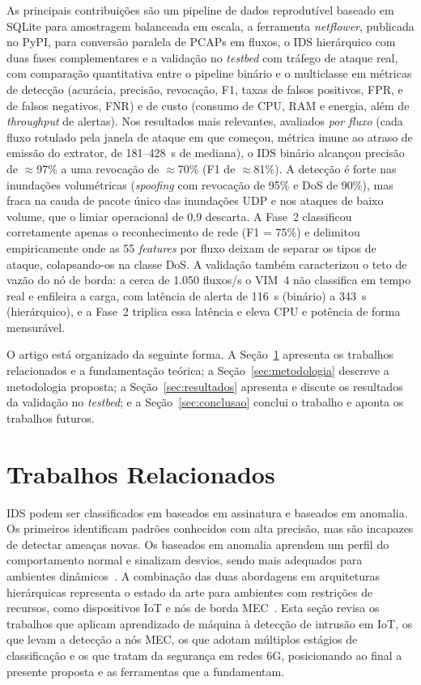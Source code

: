 \documentclass[12pt]{article}
\begin{document}
As principais contribuições são um pipeline de dados reprodutível baseado em
SQLite para amostragem balanceada em escala, a ferramenta \textit{netflower},
publicada no PyPI, para conversão paralela de PCAPs em fluxos, o IDS hierárquico
com duas fases complementares e a validação no \textit{testbed} com tráfego de
ataque real, com comparação quantitativa entre o pipeline binário e o
multiclasse em métricas de detecção (acurácia, precisão, revocação, F1, taxas de
falsos positivos, FPR, e de falsos negativos, FNR) e de custo (consumo de CPU, RAM e energia, além de \textit{throughput} de alertas). Nos resultados mais relevantes, avaliados \emph{por fluxo} (cada fluxo rotulado pela janela de ataque em que começou, métrica imune ao atraso de emissão do extrator, de 181--428~s de mediana), o IDS binário alcançou precisão de $\approx$97\% a uma revocação de $\approx$70\% (F1 de $\approx$81\%). A detecção é forte nas inundações volumétricas (\textit{spoofing} com revocação de 95\% e DoS de 90\%), mas fraca na cauda de pacote único das inundações UDP e nos ataques de baixo volume, que o limiar operacional de 0,9 descarta. A Fase~2 classificou corretamente apenas o reconhecimento de rede (F1 = 75\%) e delimitou empiricamente onde as 55 \textit{features} por fluxo deixam de separar os tipos de ataque, colapsando-os na classe DoS. A validação também caracterizou o teto de vazão do nó de borda: a cerca de 1.050 fluxos/s o VIM~4 não classifica em tempo real e enfileira a carga, com latência de alerta de 116~s (binário) a 343~s (hierárquico), e a Fase~2 triplica essa latência e eleva CPU e potência de forma mensurável.

O artigo está organizado da seguinte forma. A Seção~\ref{trabalhosRelacionados} apresenta os trabalhos relacionados e a fundamentação teórica; a Seção~\ref{sec:metodologia} descreve a metodologia proposta; a Seção~\ref{sec:resultados} apresenta e discute os resultados da validação no \textit{testbed}; e a Seção~\ref{sec:conclusao} conclui o trabalho e aponta os trabalhos futuros.

\section{Trabalhos Relacionados}
\label{trabalhosRelacionados}

IDS podem ser classificados em baseados em assinatura e baseados em anomalia.
Os primeiros identificam padrões conhecidos com alta precisão, mas são incapazes de detectar ameaças novas. Os baseados em anomalia aprendem um perfil do comportamento normal e sinalizam desvios, sendo mais adequados para ambientes dinâmicos~\cite{lazarevic:05}. A combinação das duas abordagens em arquiteturas hierárquicas representa o estado da arte para ambientes com restrições de recursos, como dispositivos IoT e nós de borda MEC~\cite{zolanvari:19}. Esta seção revisa os trabalhos que aplicam aprendizado de máquina à detecção de intrusão em IoT, os que levam a detecção a nós MEC, os que adotam múltiplos estágios de classificação e os que tratam da segurança em redes 6G, posicionando ao final a presente proposta e as ferramentas que a fundamentam.
\end{document}
